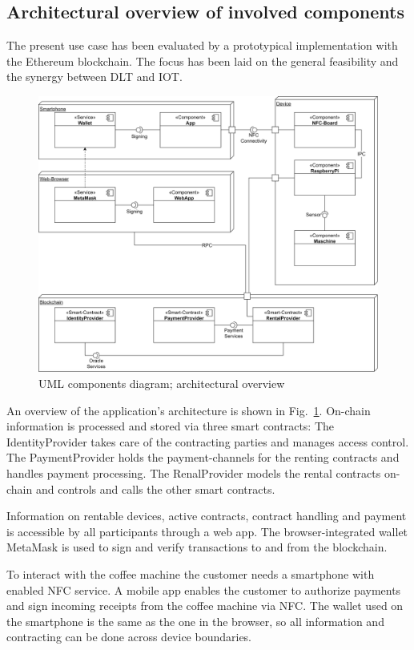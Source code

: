 \documentclass[conference]{IEEEtran}
\begin{document}
%
\subsection{Architectural overview of involved components}

The present use case has been evaluated by a prototypical implementation with the Ethereum blockchain. The focus has been laid on the general feasibility and the synergy between DLT and IOT. 

\begin{figure}[hbt]
\centering
\includegraphics[width=1.0\textwidth]{Architecture.png}
\caption{UML components diagram; architectural overview}
\label{fig:architecture}
\end{figure}

An overview of the application's architecture is shown in Fig.~\ref{fig:architecture}. On-chain information is processed and stored via three smart contracts: The IdentityProvider takes care of the contracting parties and manages access control. The PaymentProvider holds the payment-channels for the renting contracts and handles payment processing. The RenalProvider models the rental contracts on-chain and controls and calls the other smart contracts.

Information on rentable devices, active contracts, contract handling and payment is accessible by all participants through a web app. The browser-integrated wallet MetaMask is used to sign and verify transactions to and from the blockchain.

To interact with the coffee machine the customer needs a smartphone with enabled NFC service. A mobile app enables the customer to authorize payments and sign incoming receipts from the coffee machine via NFC. The wallet used on the smartphone is the same as the one in the browser, so all information and contracting can be done across device boundaries.
\end{document}
